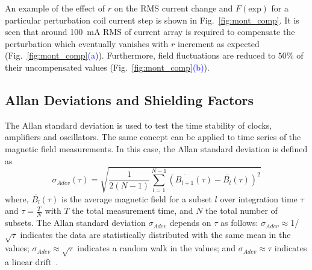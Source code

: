 An example of the effect of $r$ on the RMS current change  and $F(\mathrm{exp})$ for a particular perturbation coil current step is shown in Fig.~\ref{fig:mont_comp}. It is seen that around 100~mA RMS of current array is required to compensate the perturbation
which eventually vanishes with $r$ increment as expected (Fig.~\ref{fig:mont_comp}\textcolor{blue}{(a)}). Furthermore, field fluctuations are reduced to $50\%$ of their uncompensated values (Fig.~\ref{fig:mont_comp}\textcolor{blue}{(b)}).



 \subsection{Allan Deviations and Shielding Factors}
 
The Allan standard deviation \cite{allan} is used to test the time stability of clocks, amplifiers and oscillators. The same concept can be applied to time series of the magnetic field measurements. In this case, the Allan standard deviation is defined as~\cite{bea}
\begin{equation}\label{eq:adev}
    \sigma_{Adev} (\tau)=\sqrt{\frac{1}{2(N-1)}\sum_{l=1}^{N-1} \left(\overline{B_{l+1}}(\tau)-\overline{B_l}(\tau)\right)^2}
\end{equation}
where, $\overline{B_l}(\tau)$ is the average magnetic field for a subset $l$ over integration time $\tau$ and $\tau = \frac{T}{N}$ with $T$ the total measurement time, and $N$ the total number of subsets. The Allan standard deviation $\sigma_{Adev}$ depends on $\tau$ as follows: $\sigma_{Adev}\approx$1/$\sqrt{\tau}$ indicates the data are statistically distributed with the same mean in the values; $\sigma_{Adev}\approx \sqrt{\tau}$ indicates a random walk in the values; and $\sigma_{Adev}\approx \tau$ indicates a linear drift~\cite{allan_tau}. 



